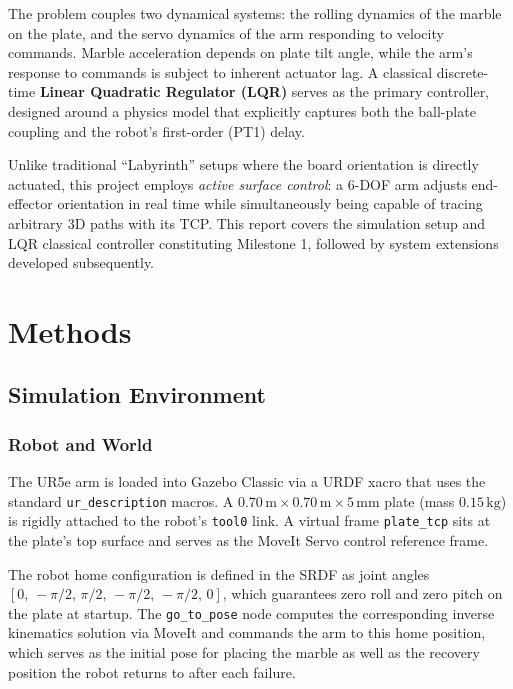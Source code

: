 \documentclass[journal]{IEEEtran}
\begin{document}
The problem couples two dynamical systems: the rolling dynamics of the marble on the plate, and the servo
dynamics of the arm responding to velocity commands. Marble acceleration depends on plate tilt angle, while
the arm's response to commands is subject to inherent actuator lag. A classical discrete-time
\textbf{Linear Quadratic Regulator (LQR)} serves as the primary controller, designed around a physics model
that explicitly captures both the ball-plate coupling and the robot's first-order (PT1) delay.

Unlike traditional ``Labyrinth'' setups where the board orientation is directly actuated, this project
employs \textit{active surface control}: a 6-DOF arm adjusts end-effector orientation in real time while
simultaneously being capable of tracing arbitrary 3D paths with its TCP. This report covers the
simulation setup and LQR classical controller constituting Milestone 1, followed by system extensions
developed subsequently.

\section{Methods}

\subsection{Simulation Environment}

\subsubsection{Robot and World}
The UR5e arm is loaded into Gazebo Classic via a URDF xacro that uses the standard \texttt{ur\_description}
macros. A $0.70\,\mathrm{m} \times 0.70\,\mathrm{m} \times 5\,\mathrm{mm}$ plate (mass
$0.15\,\mathrm{kg}$) is rigidly attached to the robot's \texttt{tool0} link. A virtual frame
\texttt{plate\_tcp} sits at the plate's top surface and serves as the MoveIt Servo control reference frame.

The robot home configuration is defined in the SRDF as joint angles $[0,\,-\pi/2,\,\pi/2,\,-\pi/2,\,-\pi/2,\,0]$, which guarantees zero roll and zero pitch on the plate at startup. The \texttt{go\_to\_pose} node computes the corresponding inverse kinematics solution via MoveIt and commands the arm to this home position, which serves as the initial pose for placing the marble as well as the recovery position the robot returns to after each failure.
\end{document}
